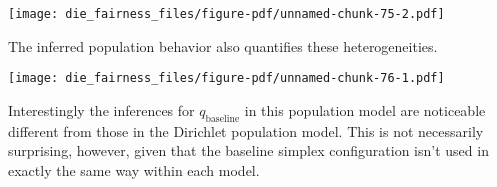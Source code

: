 \documentclass[
  letterpaper,
  DIV=11,
  numbers=noendperiod]{scrartcl}
\newenvironment{Shaded}{\begin{snugshade}}{\end{snugshade}}
\newcommand{\AttributeTok}[1]{\textcolor[rgb]{0.40,0.45,0.13}{#1}}
\newcommand{\ControlFlowTok}[1]{\textcolor[rgb]{0.00,0.23,0.31}{#1}}
\newcommand{\DecValTok}[1]{\textcolor[rgb]{0.68,0.00,0.00}{#1}}
\newcommand{\FloatTok}[1]{\textcolor[rgb]{0.68,0.00,0.00}{#1}}
\newcommand{\FunctionTok}[1]{\textcolor[rgb]{0.28,0.35,0.67}{#1}}
\newcommand{\NormalTok}[1]{\textcolor[rgb]{0.00,0.23,0.31}{#1}}
\newcommand{\OtherTok}[1]{\textcolor[rgb]{0.00,0.23,0.31}{#1}}
\newcommand{\SpecialCharTok}[1]{\textcolor[rgb]{0.37,0.37,0.37}{#1}}
\newcommand{\StringTok}[1]{\textcolor[rgb]{0.13,0.47,0.30}{#1}}
\begin{document}
\texttt{[image: die\_fairness\_files/figure-pdf/unnamed-chunk-75-2.pdf]}

The inferred population behavior also quantifies these heterogeneities.

\begin{Shaded}
\end{Shaded}

\texttt{[image: die\_fairness\_files/figure-pdf/unnamed-chunk-76-1.pdf]}

Interestingly the inferences for \(q_{\mathrm{baseline}}\) in this
population model are noticeable different from those in the Dirichlet
population model. This is not necessarily surprising, however, given
that the baseline simplex configuration isn't used in exactly the same
way within each model.
\end{document}
